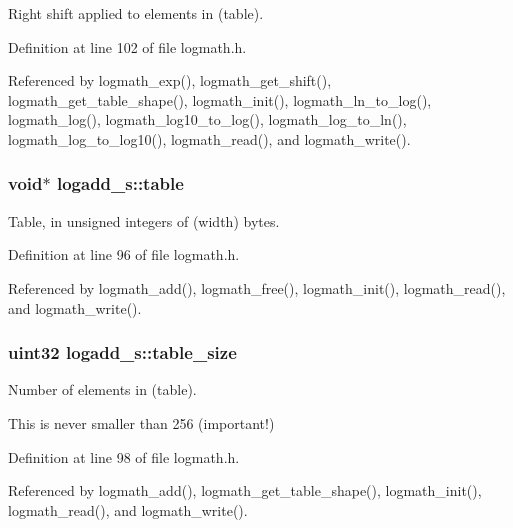 \-Right shift applied to elements in (table). 



\-Definition at line 102 of file logmath.\-h.



\-Referenced by logmath\-\_\-exp(), logmath\-\_\-get\-\_\-shift(), logmath\-\_\-get\-\_\-table\-\_\-shape(), logmath\-\_\-init(), logmath\-\_\-ln\-\_\-to\-\_\-log(), logmath\-\_\-log(), logmath\-\_\-log10\-\_\-to\-\_\-log(), logmath\-\_\-log\-\_\-to\-\_\-ln(), logmath\-\_\-log\-\_\-to\-\_\-log10(), logmath\-\_\-read(), and logmath\-\_\-write().

\subsubsection[{table}]{\setlength{\rightskip}{0pt plus 5cm}void$\ast$ {\bf logadd\-\_\-s\-::table}}\label{structlogadd__s_a27793577d513d85cd73c2daffc140695}


\-Table, in unsigned integers of (width) bytes. 



\-Definition at line 96 of file logmath.\-h.



\-Referenced by logmath\-\_\-add(), logmath\-\_\-free(), logmath\-\_\-init(), logmath\-\_\-read(), and logmath\-\_\-write().

\subsubsection[{table\-\_\-size}]{\setlength{\rightskip}{0pt plus 5cm}uint32 {\bf logadd\-\_\-s\-::table\-\_\-size}}\label{structlogadd__s_a484c53a05b46d863d0456af679cee5d8}


\-Number of elements in (table). 

\-This is never smaller than 256 (important!) 

\-Definition at line 98 of file logmath.\-h.



\-Referenced by logmath\-\_\-add(), logmath\-\_\-get\-\_\-table\-\_\-shape(), logmath\-\_\-init(), logmath\-\_\-read(), and logmath\-\_\-write().


